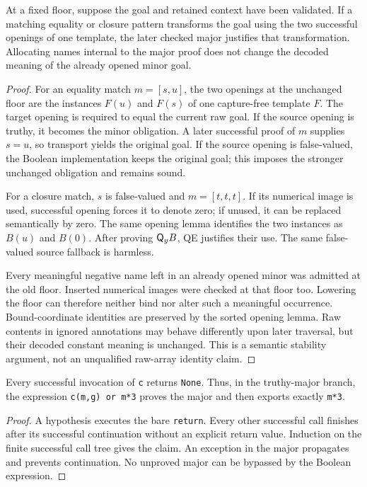 \begin{lemma}
\label{lem:frozen}
At a fixed floor, suppose the goal and retained context have been
validated. If a matching equality or closure pattern transforms the
goal using the two successful openings of one template, the later
checked major justifies that transformation. Allocating names internal
to the major proof does not change the decoded meaning of the already
opened minor goal.
\end{lemma}
\begin{proof}
For an equality match $m=[s,u]$, the two openings at the unchanged floor
are the instances $F(u)$ and $F(s)$ of one capture-free template $F$.
The target opening is required to equal the current raw goal. If the
source opening is truthy, it becomes the minor obligation. A later
successful proof of $m$ supplies $s=u$, so transport yields the original
goal. If the source opening is false-valued, the Boolean implementation
keeps the original goal; this imposes the stronger unchanged obligation
and remains sound.

For a closure match, $s$ is false-valued and $m=[t,t,t]$. If its numerical
image is used, successful opening forces it to denote zero; if unused,
it can be replaced semantically by zero. The same opening lemma identifies
the two instances as $B(u)$ and $B(0)$.
After proving $\mathsf Q_yB$, QE justifies their use. The same false-valued
source fallback is harmless.

Every meaningful negative name left in an already opened minor was
admitted at the old floor. Inserted numerical images were checked at
that floor too. Lowering the floor can therefore neither bind nor alter
such a meaningful occurrence. Bound-coordinate identities are preserved
by the sorted opening lemma. Raw contents in ignored annotations may
behave differently upon later traversal, but their decoded constant
meaning is unchanged. This is a semantic stability argument, not an
unqualified raw-array identity claim.
\end{proof}

\begin{lemma}
Every successful invocation of \texttt{c} returns \texttt{None}.
Thus, in the truthy-major branch, the expression
\texttt{c(m,g) or m*3} proves the major and then exports exactly
\texttt{m*3}.
\end{lemma}
\begin{proof}
A hypothesis executes the bare \texttt{return}. Every other successful
call finishes after its successful continuation without an explicit
return value. Induction on the finite successful call tree gives the
claim. An exception in the major propagates and prevents continuation.
No unproved major can be bypassed by the Boolean expression.
\end{proof}


